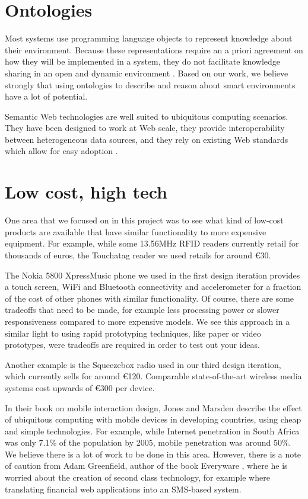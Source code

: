 \section{Ontologies}

Most systems use programming language objects to represent knowledge about their environment. Because these representations require an a priori agreement on how they will be implemented in a system, they do not facilitate knowledge sharing in an open and dynamic environment \cite{Chen2004}. Based on our work, we believe strongly that using ontologies to describe and reason about smart environments have a lot of potential.  
	
Semantic Web technologies are well suited to ubiquitous computing scenarios. They have been designed to work at Web scale, they provide interoperability between heterogeneous data sources, and they rely on existing Web standards which allow for easy adoption \cite{Sabou2010}.

\section{Low cost, high tech}

One area that we focused on in this project was to see what kind of low-cost products are available that have similar functionality to more expensive equipment. For example, while some 13.56MHz \ac{RFID} readers currently retail for thousands of euros, the Touchatag reader we used retails for around \euro 30.  

The Nokia 5800 XpressMusic phone we used in the first design iteration provides a touch screen, WiFi and Bluetooth connectivity and accelerometer for a fraction of the cost of other phones with similar functionality. Of course, there are some tradeoffs that need to be made, for example less processing power or slower responsiveness compared to more expensive models. We see this approach in a similar light to using rapid prototyping techniques, like paper or video prototypes, were tradeoffs are required in order to test out your ideas.

Another example is the Squeezebox radio used in our third design iteration, which currently sells for around \euro 120. Comparable state-of-the-art wireless media systems cost upwards of \euro 300 per device.

In their book on mobile interaction design, Jones and Marsden \cite{Jones2006} describe the effect of ubiquitous computing with mobile devices in developing countries, using cheap and simple technologies.  For example, while Internet penetration in South Africa was only 7.1\% of the population by 2005, mobile penetration was around 50\%. We believe there is a lot of work to be done in this area. However, there is a note of caution from Adam Greenfield, author of the book Everyware \cite{Greenfield2006}, where he is worried about the creation of second class technology, for example where translating financial web applications into an SMS-based system.


